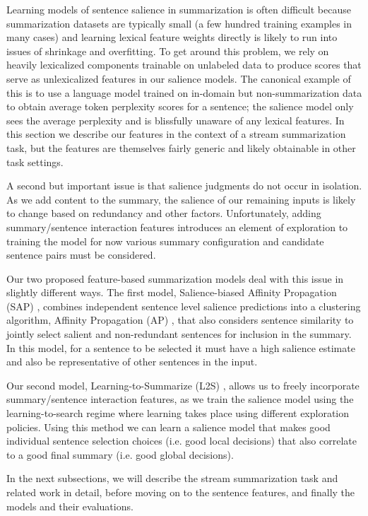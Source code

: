 Learning models of sentence salience in summarization is often difficult
because summarization datasets are typically small (a few hundred training
examples in many cases) and learning lexical 
feature weights directly is likely to run into issues of shrinkage and 
overfitting. 
To get around this problem, we rely on heavily lexicalized components 
trainable on unlabeled data to produce scores that serve as unlexicalized 
features in our salience models. The canonical example of this is to use 
a language model trained on in-domain but non-summarization data to 
obtain average token perplexity scores for a sentence; the salience model
only sees the average perplexity and is blissfully unaware of any lexical 
features. 
In this section we 
describe our features in the context of a stream summarization task, but the 
features are themselves fairly generic and likely obtainable in other task
settings.

A second but important issue is that salience judgments do not occur
in isolation. As we add content to the summary, the salience
of our remaining inputs is likely to change based on redundancy and other 
factors.
Unfortunately, adding summary/sentence interaction features introduces an element of 
exploration to training the model for now various summary configuration 
and candidate sentence pairs must be considered.

Our two proposed feature-based summarization models deal with this
issue in slightly different ways. 
The first model, Salience-biased Affinity Propagation (SAP) 
\citep{kedzie2015predicting}, combines 
independent sentence level salience predictions into a clustering algorithm,
Affinity Propagation (AP) \citep{frey2007clustering}, that also 
considers sentence similarity to jointly select salient and 
non-redundant sentences for inclusion in the summary. In this model, for 
a sentence to be selected it must have a high salience estimate
and also be
representative of other sentences in the input.

Our second model, Learning-to-Summarize (L2S) \citep{kedzie2016real}, allows 
us to freely incorporate summary/sentence interaction
features, as we train the salience model using the learning-to-search regime
\citep{daume2009search,chang2015learning}
where learning takes place using different exploration policies. Using 
this method we can learn a salience model that makes good individual sentence
selection choices (i.e. good local decisions) that also correlate to a good 
final summary (i.e. good global decisions). 

In the next subsections, we will describe the stream summarization task
and related work 
in detail, before moving on to the sentence features, and finally the models
and their evaluations.


